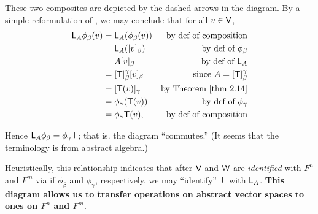 \begin{remark} \label{remark 2.4.6}
These two composites are depicted by the dashed arrows in the diagram.
By a simple reformulation of , we may conclude that for all \(v \in \textsf{V}\),
\begin{align*}
    \LMTRAN_A \phi_{\beta}(v)
    & = \LMTRAN_A (\phi_{\beta}(v)) & \text{by def of composition} \\
    & = \LMTRAN_A([v]_{\beta}) & \text{by def of \(\phi_{\beta}\)} \\
    & = A [v]_{\beta} & \text{by def of \(\LMTRAN_A\)} \\
    & = [\T]_{\beta}^{\gamma} [v]_{\beta} & \text{since \(A = [\T]_{\beta}^{\gamma}\)} \\
    & = [\T(v)]_{\gamma} & \text{by \THM{2.14}} \\
    & = \phi_{\gamma}(\T(v)) & \text{by def of \(\phi_{\gamma}\)} \\
    & = \phi_{\gamma} \T (v), & \text{by def of composition}
\end{align*}

Hence \(\textsf{L}_A \phi_{\beta} = \phi_{\gamma} \textsf{T}\);
that is. the diagram ``commutes.'' (It seems that the terminology is from abstract algebra.)

Heuristically, this relationship indicates that after \(\textsf{V}\) and \(\textsf{W}\) are \emph{identified} with \(F^n\) and \(F^m\) via if \(\phi_{\beta}\) and \(\phi_{\gamma}\), respectively,
we may ``identify'' \(\textsf{T}\) with \(\textsf{L}_A\).
\textbf{This diagram allows us to transfer operations on abstract vector spaces to ones on \(F^n\) and \(F^m\)}.
\end{remark}

